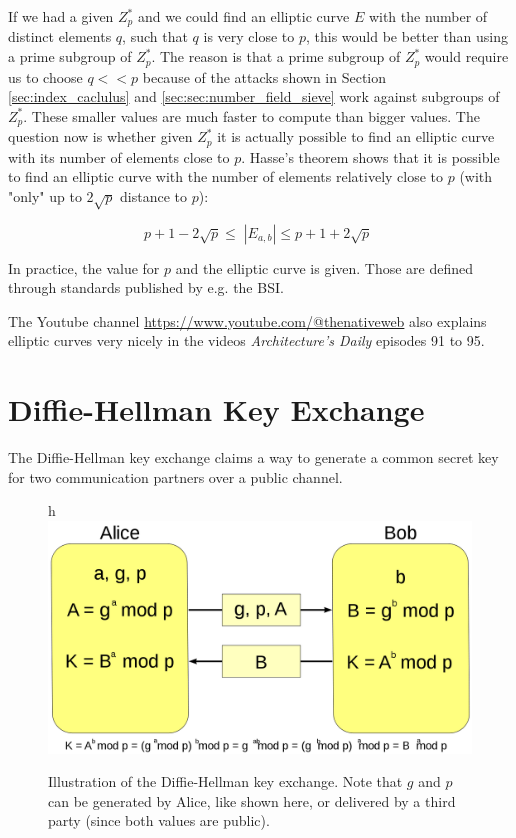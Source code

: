 If we had a given $Z_p^*$ and we could find an elliptic curve $E$ with the number of distinct elements $q$, such that $q$ is very close to $p$, this would be better than using a prime subgroup of $Z_p^*$.
The reason is that a prime subgroup of $Z_p^*$ would require us to choose $q << p$ because of the attacks shown in Section \ref{sec:index_caclulus} and \ref{sec:sec:number_field_sieve} work against subgroups of $Z_p^*$.
These smaller values are much faster to compute than bigger values.
The question now is whether given $Z_p^*$ it is actually possible to find an elliptic curve with its number of elements close to $p$.
Hasse's theorem shows that it is possible to find an elliptic curve with the number of elements relatively close to $p$ (with "only" up to $2\sqrt{p}$ distance to $p$):

$$
    p+1 - 2 \sqrt{p} \leq \; |E_{a,b}| \leq p+1 + 2 \sqrt{p}\;
$$

In practice, the value for $p$ and the elliptic curve is given.
Those are defined through standards published by e.g. the BSI.

The Youtube channel \url{https://www.youtube.com/@thenativeweb} also explains elliptic curves very nicely in the videos \textit{Architecture's Daily} episodes 91 to 95.

\section{Diffie-Hellman Key Exchange}\label{sec:diffie_hellman}

The Diffie-Hellman key exchange claims a way to generate a common secret key for two communication partners over a public channel.

\begin{figure}{h}
    \center
    \includegraphics[width=\linewidth]{gfx/diffie-helman.png}
    \caption{Illustration of the Diffie-Hellman key exchange. Note that $g$ and $p$ can be generated by Alice, like shown here, or delivered by a third party (since both values are public).}
    \label{fig:diffie_hellman}
\end{figure}

